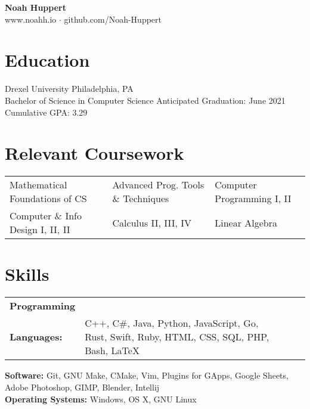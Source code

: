 \documentclass[10pt]{article}
\begin{document}
\centering
	\textbf{Noah Huppert} \\
	
	www.noahh.io $\cdot$ github.com/Noah-Huppert


\begin{flushleft}

\section{Education}
	Drexel University \hfill Philadelphia, PA \\
	Bachelor of Science in Computer Science \hfill Anticipated Graduation: June 2021 \\
	Cumulative GPA: 3.29

\section{Relevant Coursework}
	\begin{tabularx}{\textwidth}{X X X}
		Mathematical Foundations of CS & Advanced Prog. Tools \& Techniques & Computer Programming I, II \\
		Computer \& Info Design I, II, II & Calculus II, III, IV & Linear Algebra \\
	\end{tabularx}

\section{Skills}
	\begin{tabularx}{\textwidth}{@{}ll@{} l X}
	\textbf{Programming} \\
	\textbf{Languages:}

	& 

	\topskip0pt
	\vspace*{\fill}
	C++, C\#, Java, Python, JavaScript, Go, Rust, Swift, Ruby, HTML, CSS, SQL, PHP, Bash, LaTeX
	\vspace*{\fill}

	\end{tabularx}
	\textbf{Software:} Git, GNU Make, CMake, Vim, Plugins for GApps, Google Sheets, Adobe Photoshop, GIMP, Blender, Intellij \\
	\textbf{Operating Systems:} Windows, OS X, GNU Linux


\end{flushleft}
\end{document}
